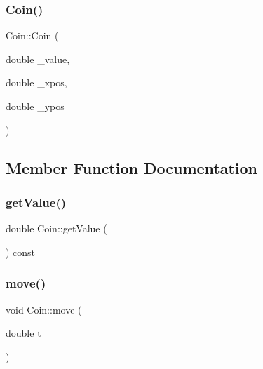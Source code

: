 \mbox{\label{class_coin_ad9c43b40a4d31b251225e44cac231679}} 
\subsubsection{\texorpdfstring{Coin()}{Coin()}\hspace{0.1cm}{\footnotesize\ttfamily [2/2]}}
{\footnotesize\ttfamily Coin\+::\+Coin (\begin{DoxyParamCaption}\item[{double}]{\+\_\+value,  }\item[{double}]{\+\_\+xpos,  }\item[{double}]{\+\_\+ypos }\end{DoxyParamCaption})}



\subsection{Member Function Documentation}
\mbox{\label{class_coin_a53cbddb74ac97ec54ec40f09beab3332}} 
\subsubsection{\texorpdfstring{get\+Value()}{getValue()}}
{\footnotesize\ttfamily double Coin\+::get\+Value (\begin{DoxyParamCaption}{ }\end{DoxyParamCaption}) const}

\mbox{\label{class_coin_a58a2a28aa6c21f0045983755dad015dc}} 
\subsubsection{\texorpdfstring{move()}{move()}}
{\footnotesize\ttfamily void Coin\+::move (\begin{DoxyParamCaption}\item[{double}]{t }\end{DoxyParamCaption})}

\mbox{\label{class_coin_adaf4dcbe15a8d4549b4ccdaaca18c9bb}} 
